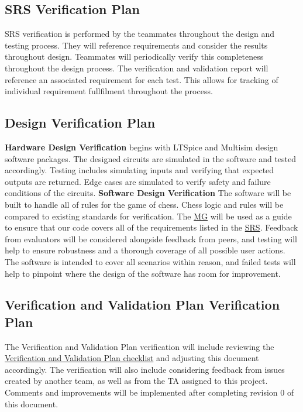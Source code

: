 \documentclass[12pt, titlepage]{article}
\begin{document}
\subsection{SRS Verification Plan}
SRS verification is performed by the teammates throughout the design and testing 
process. They will reference requirements and consider the results throughout design. 
Teammates will periodically verify this completeness throughout the design process. 
The verification and validation report will reference an associated requirement for 
each test. This allows for tracking of individual requirement fullfilment 
throughout the process. 


\subsection{Design Verification Plan}
\textbf{Hardware Design Verification} begins with LTSpice and Multisim design software
packages. The designed circuits are simulated in the software and tested accordingly.
Testing includes simulating inputs and verifying that expected outputs are returned. 
Edge cases are simulated to verify safety and failure conditions of the circuits. 
\newline
\newline
\textbf{Software Design Verification} The software will be built to handle all of rules for
the game of chess. Chess logic and rules will be compared to existing standards for verification.
The \href{file:../Design/SoftArchitecture/MG.pdf}{MG} will be used as a guide to ensure that our
code covers all of the requirements listed in the \href{file:../SRS/SRS.pdf}{SRS}. Feedback from
evaluators will be considered alongside feedback from peers, and testing will help to ensure robustness
and a thorough coverage of all possible user actions. The software is intended to cover all scenarios
within reason, and failed tests will help to pinpoint where the design of the software has room for
improvement.

\subsection{Verification and Validation Plan Verification Plan}

The Verification and Validation Plan verification will include reviewing the 
\href{file:../Checklists/VnV-Checklist.pdf}{Verification and Validation Plan checklist} and adjusting this document accordingly. 
The verification will also include considering feedback from issues created by another team, as well as from the TA assigned to this project. 
Comments and improvements will be implemented after completing revision 0 of this document.
\end{document}
